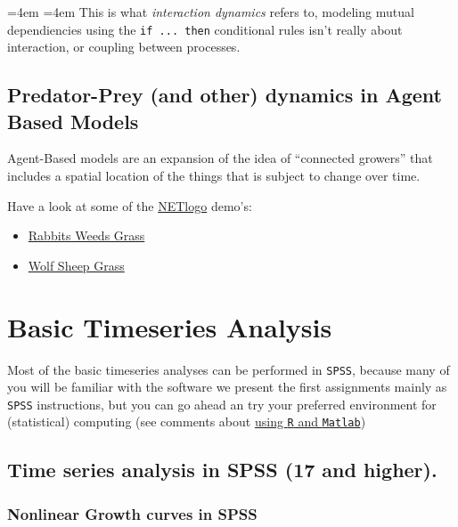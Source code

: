 \documentclass[]{book}
\providecommand{\tightlist}{%
  \setlength{\itemsep}{0pt}\setlength{\parskip}{0pt}}
\renewenvironment{quote}{%
  \par \small \medskip \block
  \leftskip=4em \rightskip=4em%
  \noindent \ignorespaces}{%
  \par \medskip
  }
\let\stdsection\section
\renewcommand\section{\newpage\stdsection}
\begin{document}
\begin{quote}
This is what \emph{interaction dynamics} refers to, modeling mutual
dependiencies using the \texttt{if\ ...\ then} conditional rules isn't
really about interaction, or coupling between processes.
\end{quote}

\section{Predator-Prey (and other) dynamics in Agent Based
Models}\label{predator-prey-and-other-dynamics-in-agent-based-models}

Agent-Based models are an expansion of the idea of ``connected growers''
that includes a spatial location of the things that is subject to change
over time.

Have a look at some of the
\href{http://ccl.northwestern.edu/netlogo/}{NETlogo} demo's:

\begin{itemize}
\tightlist
\item
  \href{http://www.netlogoweb.org/launch\#http://www.netlogoweb.org/assets/modelslib/Sample\%20Models/Biology/Rabbits\%20Grass\%20Weeds.nlogo}{Rabbits
  Weeds Grass}
\item
  \href{http://www.netlogoweb.org/launch\#http://www.netlogoweb.org/assets/modelslib/Sample\%20Models/Biology/Wolf\%20Sheep\%20Predation.nlogo}{Wolf
  Sheep Grass}
\end{itemize}

\chapter{Basic Timeseries Analysis}\label{bta}

Most of the basic timeseries analyses can be performed in \texttt{SPSS},
because many of you will be familiar with the software we present the
first assignments mainly as \texttt{SPSS} instructions, but you can go
ahead an try your preferred environment for (statistical) computing (see
comments about \protect\hyperlink{bTSAinR}{using \texttt{R} and
\texttt{Matlab}})

\section{Time series analysis in SPSS (17 and
higher).}\label{time-series-analysis-in-spss-17-and-higher.}

\subsection{Nonlinear Growth curves in
SPSS}\label{nonlinear-growth-curves-in-spss}
\end{document}
